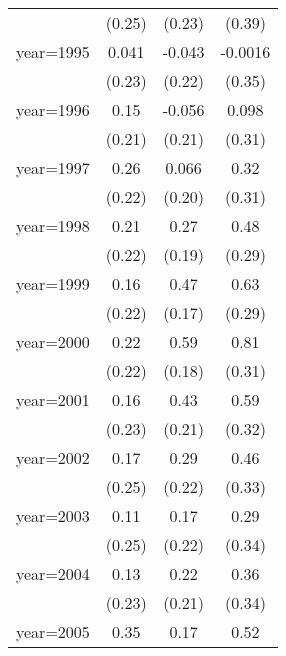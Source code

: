 \begin{sidewaystable}[htbp]
\begin{tabular}{l*{3}{c}}
                &   (0.25)         &   (0.23)         &   (0.39)         \\
\addlinespace
year=1995       &    0.041         &   -0.043         &  -0.0016         \\
                &   (0.23)         &   (0.22)         &   (0.35)         \\
\addlinespace
year=1996       &     0.15         &   -0.056         &    0.098         \\
                &   (0.21)         &   (0.21)         &   (0.31)         \\
\addlinespace
year=1997       &     0.26         &    0.066         &     0.32         \\
                &   (0.22)         &   (0.20)         &   (0.31)         \\
\addlinespace
year=1998       &     0.21         &     0.27         &     0.48\sym{*}  \\
                &   (0.22)         &   (0.19)         &   (0.29)         \\
\addlinespace
year=1999       &     0.16         &     0.47\sym{***}&     0.63\sym{**} \\
                &   (0.22)         &   (0.17)         &   (0.29)         \\
\addlinespace
year=2000       &     0.22         &     0.59\sym{***}&     0.81\sym{**} \\
                &   (0.22)         &   (0.18)         &   (0.31)         \\
\addlinespace
year=2001       &     0.16         &     0.43\sym{**} &     0.59\sym{*}  \\
                &   (0.23)         &   (0.21)         &   (0.32)         \\
\addlinespace
year=2002       &     0.17         &     0.29         &     0.46         \\
                &   (0.25)         &   (0.22)         &   (0.33)         \\
\addlinespace
year=2003       &     0.11         &     0.17         &     0.29         \\
                &   (0.25)         &   (0.22)         &   (0.34)         \\
\addlinespace
year=2004       &     0.13         &     0.22         &     0.36         \\
                &   (0.23)         &   (0.21)         &   (0.34)         \\
\addlinespace
year=2005       &     0.35         &     0.17         &     0.52         \\

\end{tabular}
\end{sidewaystable}

